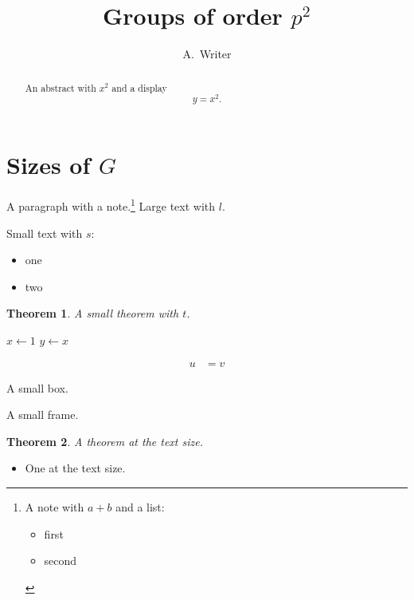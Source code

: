 \documentclass[11pt]{article}
\title{Groups of order $p^2$}
\author{A.~Writer}
\newtheorem{theorem}{Theorem}
\begin{document}
\maketitle
\begin{abstract}
An abstract with $x^2$ and a display
\[ y = x^2. \]
\end{abstract}

\section{Sizes of $G$}
A paragraph with a note.\footnote{A note with $a+b$ and a list:
\begin{itemize}\item first\item second\end{itemize}}
{\large Large text with $l$.}

{\small Small text with $s$:
\begin{itemize}\item one\item two\end{itemize}
\begin{theorem}A small theorem with $t$.\end{theorem}
\begin{algorithmic}[1]
\State $x \gets 1$
\State $y \gets x$
\EndIf
\end{algorithmic}
\begin{align} u &= v \end{align}
\begin{tcolorbox}A small box.\end{tcolorbox}
\begin{mdframed}A small frame.\end{mdframed}
}

\begin{theorem}A theorem at the text size.\end{theorem}
\begin{itemize}\item One at the text size.\end{itemize}
\end{document}
